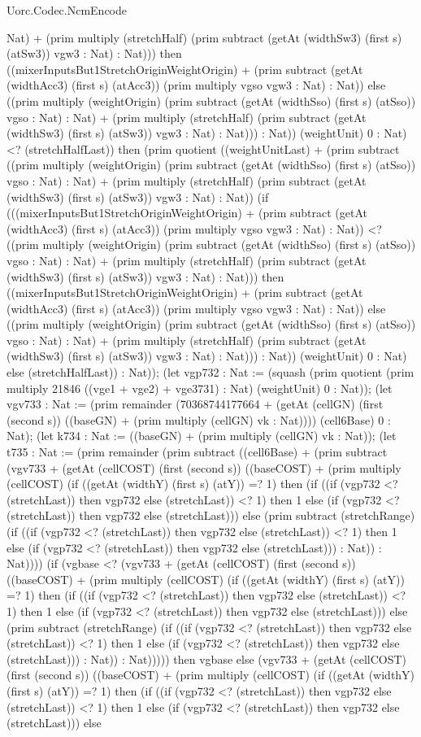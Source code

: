 \begin{lexlean}{Uorc.Codec.NcmEncode}
\begin{semanticmodule}
{Nat) + (prim multiply (stretchHalf) (prim subtract (getAt (widthSw3) (first s) (atSw3)) vgw3 : Nat) : Nat))) then ((mixerInputsBut1StretchOriginWeightOrigin) + (prim subtract (getAt (widthAcc3) (first s) (atAcc3)) (prim multiply vgso vgw3 : Nat) : Nat)) else ((prim multiply (weightOrigin) (prim subtract (getAt (widthSso) (first s) (atSso)) vgso : Nat) : Nat) + (prim multiply (stretchHalf) (prim subtract (getAt (widthSw3) (first s) (atSw3)) vgw3 : Nat) : Nat))) : Nat)) (weightUnit) 0 : Nat) <? (stretchHalfLast)) then (prim quotient ((weightUnitLast) + (prim subtract ((prim multiply (weightOrigin) (prim subtract (getAt (widthSso) (first s) (atSso)) vgso : Nat) : Nat) + (prim multiply (stretchHalf) (prim subtract (getAt (widthSw3) (first s) (atSw3)) vgw3 : Nat) : Nat)) (if (((mixerInputsBut1StretchOriginWeightOrigin) + (prim subtract (getAt (widthAcc3) (first s) (atAcc3)) (prim multiply vgso vgw3 : Nat) : Nat)) <? ((prim multiply (weightOrigin) (prim subtract (getAt (widthSso) (first s) (atSso)) vgso : Nat) : Nat) + (prim multiply (stretchHalf) (prim subtract (getAt (widthSw3) (first s) (atSw3)) vgw3 : Nat) : Nat))) then ((mixerInputsBut1StretchOriginWeightOrigin) + (prim subtract (getAt (widthAcc3) (first s) (atAcc3)) (prim multiply vgso vgw3 : Nat) : Nat)) else ((prim multiply (weightOrigin) (prim subtract (getAt (widthSso) (first s) (atSso)) vgso : Nat) : Nat) + (prim multiply (stretchHalf) (prim subtract (getAt (widthSw3) (first s) (atSw3)) vgw3 : Nat) : Nat))) : Nat)) (weightUnit) 0 : Nat) else (stretchHalfLast)) : Nat)); (let vgp732 : Nat := (squash (prim quotient (prim multiply 21846 ((vge1 + vge2) + vge3731) : Nat) (weightUnit) 0 : Nat)); (let vgv733 : Nat := (prim remainder (70368744177664 + (getAt (cellGN) (first (second s)) ((baseGN) + (prim multiply (cellGN) vk : Nat)))) (cell6Base) 0 : Nat); (let k734 : Nat := ((baseGN) + (prim multiply (cellGN) vk : Nat)); (let t735 : Nat := (prim remainder (prim subtract ((cell6Base) + (prim subtract (vgv733 + (getAt (cellCOST) (first (second s)) ((baseCOST) + (prim multiply (cellCOST) (if ((getAt (widthY) (first s) (atY)) =? 1) then (if ((if (vgp732 <? (stretchLast)) then vgp732 else (stretchLast)) <? 1) then 1 else (if (vgp732 <? (stretchLast)) then vgp732 else (stretchLast))) else (prim subtract (stretchRange) (if ((if (vgp732 <? (stretchLast)) then vgp732 else (stretchLast)) <? 1) then 1 else (if (vgp732 <? (stretchLast)) then vgp732 else (stretchLast))) : Nat)) : Nat)))) (if (vgbase <? (vgv733 + (getAt (cellCOST) (first (second s)) ((baseCOST) + (prim multiply (cellCOST) (if ((getAt (widthY) (first s) (atY)) =? 1) then (if ((if (vgp732 <? (stretchLast)) then vgp732 else (stretchLast)) <? 1) then 1 else (if (vgp732 <? (stretchLast)) then vgp732 else (stretchLast))) else (prim subtract (stretchRange) (if ((if (vgp732 <? (stretchLast)) then vgp732 else (stretchLast)) <? 1) then 1 else (if (vgp732 <? (stretchLast)) then vgp732 else (stretchLast))) : Nat)) : Nat))))) then vgbase else (vgv733 + (getAt (cellCOST) (first (second s)) ((baseCOST) + (prim multiply (cellCOST) (if ((getAt (widthY) (first s) (atY)) =? 1) then (if ((if (vgp732 <? (stretchLast)) then vgp732 else (stretchLast)) <? 1) then 1 else (if (vgp732 <? (stretchLast)) then vgp732 else (stretchLast))) else }
\end{semanticmodule}
\end{lexlean}
